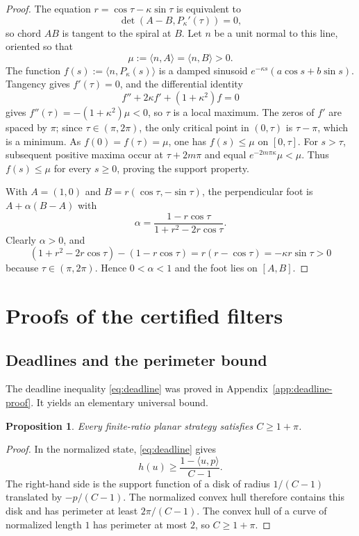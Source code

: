 \documentclass[10pt,a4paper]{article}
\newtheorem{proposition}[proposition]{Proposition}
\theoremstyle{definition}
\theoremstyle{remark}
\newcommand{\ip}[2]{\langle #1,#2\rangle}
\begin{document}
\begin{proof}
The equation $r=\cos\tau-\kappa\sin\tau$ is equivalent to
\[
\det(A-B,P_\kappa'(\tau))=0,
\]
so chord $AB$ is tangent to the spiral at $B$. Let $n$ be a unit normal to this line, oriented so that
\[
\mu:=\ip{n}{A}=\ip{n}{B}>0.
\]
The function $f(s):=\ip{n}{P_\kappa(s)}$ is a damped sinusoid $e^{-\kappa s}(a\cos s+b\sin s)$. Tangency gives $f'(\tau)=0$, and the differential identity
\[
f''+2\kappa f'+(1+\kappa^2)f=0
\]
gives $f''(\tau)=-(1+\kappa^2)\mu<0$, so $\tau$ is a local maximum. The zeros of $f'$ are spaced by $\pi$; since $\tau\in(\pi,2\pi)$, the only critical point in $(0,\tau)$ is $\tau-\pi$, which is a minimum. As $f(0)=f(\tau)=\mu$, one has $f(s)\le\mu$ on $[0,\tau]$. For $s>\tau$, subsequent positive maxima occur at $\tau+2m\pi$ and equal $e^{-2m\pi\kappa}\mu<\mu$. Thus $f(s)\le\mu$ for every $s\ge0$, proving the support property.

With $A=(1,0)$ and $B=r(\cos\tau,-\sin\tau)$, the perpendicular foot is $A+\alpha(B-A)$ with
\[
\alpha=\frac{1-r\cos\tau}{1+r^2-2r\cos\tau}.
\]
Clearly $\alpha>0$, and
\[
(1+r^2-2r\cos\tau)-(1-r\cos\tau)
=r(r-\cos\tau)
=-\kappa r\sin\tau>0
\]
because $\tau\in(\pi,2\pi)$. Hence $0<\alpha<1$ and the foot lies on $[A,B]$.
\end{proof}

\section{Proofs of the certified filters}
\label{app:filters}
\subsection{Deadlines and the perimeter bound}
The deadline inequality \eqref{eq:deadline} was proved in Appendix~\ref{app:deadline-proof}. It yields an elementary universal bound.

\begin{proposition}
\label{prop:perimeter-bound}
Every finite-ratio planar strategy satisfies $C\ge1+\pi$.
\end{proposition}

\begin{proof}
In the normalized state, \eqref{eq:deadline} gives
\[
h(u)\ge\frac{1-\ip{u}{p}}{C-1}.
\]
The right-hand side is the support function of a disk of radius $1/(C-1)$ translated by $-p/(C-1)$. The normalized convex hull therefore contains this disk and has perimeter at least $2\pi/(C-1)$. The convex hull of a curve of normalized length $1$ has perimeter at most $2$, so $C\ge1+\pi$.
\end{proof}
\end{document}
